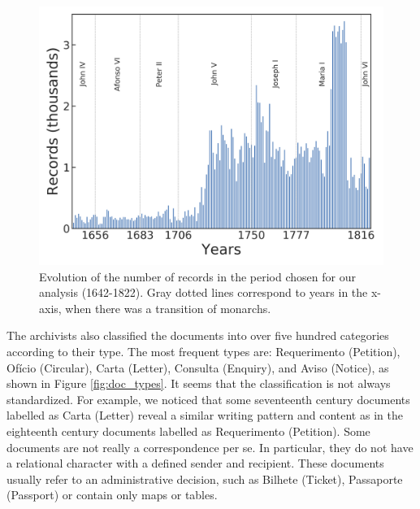\documentclass{article}
\begin{document}
\begin{figure}
	\centering
	\includegraphics[scale=0.40]{records_per_year_1642-1822.png}
	\caption{Evolution of the number of records in the period chosen for our analysis (1642-1822). Gray dotted lines correspond to years in the x-axis, when there was a transition of monarchs.}
	\label{fig:records_year}
\end{figure}

The archivists also classified the documents into over five hundred categories according to their type. The most frequent types are: Requerimento (Petition), Ofício (Circular), Carta (Letter), Consulta (Enquiry), and Aviso (Notice), as shown in Figure \ref{fig:doc_types}. It seems that the classification is not always standardized. For example, we noticed that some seventeenth century documents labelled as Carta (Letter) reveal a similar writing pattern and content as in the eighteenth century documents labelled as Requerimento (Petition). Some documents are not really a correspondence per se. In particular, they do not have a relational character with a defined sender and recipient. These documents usually refer to an administrative decision, such as Bilhete (Ticket), Passaporte (Passport) or contain only maps or tables.
\end{document}
